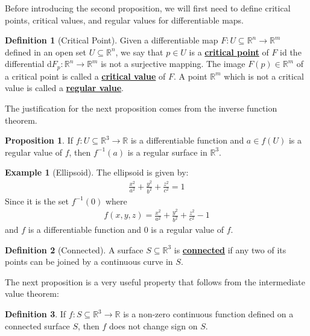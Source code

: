 \documentclass[11pt]{scrartcl}
\newcommand{\R}[0]{\mathbb{R}}
\theoremstyle{definition}
\newtheorem{definition}{Definition}
\newtheorem{prop}{Proposition}
\newtheorem{ex}{Example}
\theoremstyle{remark}
\newcommand{\dfn}[1]{\textbf{\underline{#1}}}
\begin{document}
Before introducing the second proposition, we will first need to define critical points, critical values, and regular values for differentiable maps. 

\begin{definition}[Critical Point] 
	Given a differentiable map $F: U \subseteq \R^n \rightarrow \R^m$ defined in an open set $U \subseteq \R^n$, we say that $p \in U$ is a \dfn{critical point} of $F$ id the differential d$F_p: \R^n \rightarrow \R^m$ is not a surjective mapping. The image $F(p) \in \R^m$ of a critical point is called a \dfn{critical value} of $F$. A point $\R^m$ which is not a critical value is called a \dfn{regular value}. 
\end{definition}

The justification for the next proposition comes from the inverse function theorem. 

\begin{prop}
	If $f: U \subseteq \R^3 \rightarrow \R$ is a differentiable function and $a \in f(U)$ is a regular value of $f$, then $f^{-1}(a)$ is a regular surface in $\R^3$. 
\end{prop}

\begin{ex}[Ellipsoid] 
		The ellipsoid is given by: 
		\begin{align*}
			\frac{x^2}{a^2} + \frac{y^2}{b^2} + \frac{z^2}{c^2} = 1
		\end{align*}
		Since it is the set $f^{-1}(0)$ where 
		\begin{align*}
			f(x,y,z) = \frac{x^2}{a^2} + \frac{y^2}{b^2} + \frac{z^2}{c^2} - 1
		\end{align*}
		and $f$ is a differentiable function and $0$ is a regular value of $f$. 
\end{ex}

\begin{definition}[Connected] 
	A surface $S \subseteq \R^3$ is \dfn{connected} if any two of its points can be joined by a continuous curve in $S$. 
\end{definition}

The next proposition is a very useful property that follows from the intermediate value theorem: 

\begin{definition}
	If $f: S \subseteq \R^3 \rightarrow \R$ is a non-zero continuous function defined on a connected surface $S$, then $f$ does not change sign on $S$. 
\end{definition}
\end{document}
